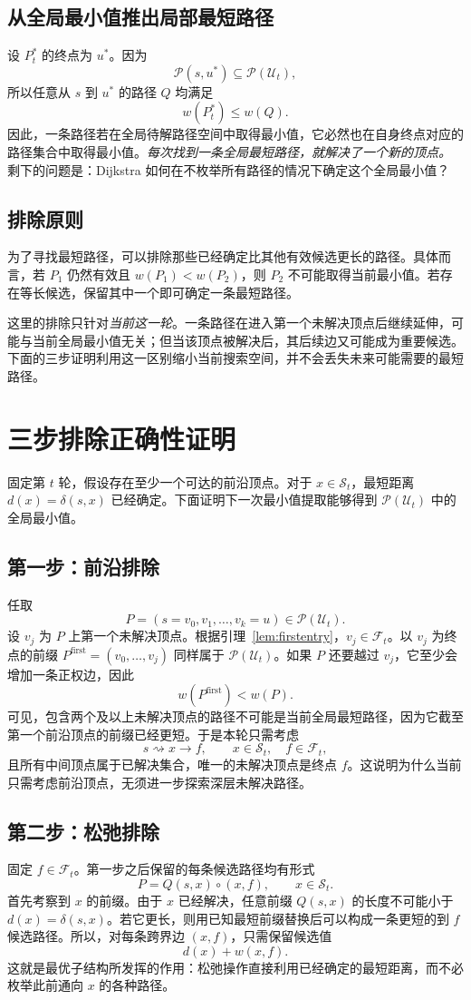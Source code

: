 \documentclass[UTF8,11pt,a4paper]{ctexart}
\newcommand{\Sset}{\mathcal S_t}
\newcommand{\Fset}{\mathcal F_t}
\newcommand{\PathU}{\mathcal P(\mathcal U_t)}
\begin{document}
\subsection{从全局最小值推出局部最短路径}
设 $P_t^*$ 的终点为 $u^*$。因为
\[
  \mathcal P(s,u^*)\subseteq\PathU,
\]
所以任意从 $s$ 到 $u^*$ 的路径 $Q$ 均满足
\[
  w(P_t^*)\le w(Q).
\]
因此，一条路径若在全局待解路径空间中取得最小值，它必然也在自身终点对应的路径集合中取得最小值。\emph{每次找到一条全局最短路径，就解决了一个新的顶点。} 剩下的问题是：Dijkstra 如何在不枚举所有路径的情况下确定这个全局最小值？

\subsection{排除原则}
为了寻找最短路径，可以排除那些已经确定比其他有效候选更长的路径。具体而言，若 $P_1$ 仍然有效且 $w(P_1)<w(P_2)$，则 $P_2$ 不可能取得当前最小值。若存在等长候选，保留其中一个即可确定一条最短路径。

这里的排除只针对\emph{当前这一轮}。一条路径在进入第一个未解决顶点后继续延伸，可能与当前全局最小值无关；但当该顶点被解决后，其后续边又可能成为重要候选。下面的三步证明利用这一区别缩小当前搜索空间，并不会丢失未来可能需要的最短路径。

\section{三步排除正确性证明}\label{sec:proof}
固定第 $t$ 轮，假设存在至少一个可达的前沿顶点。对于 $x\in\Sset$，最短距离 $d(x)=\delta(s,x)$ 已经确定。下面证明下一次最小值提取能够得到 $\PathU$ 中的全局最小值。

\subsection{第一步：前沿排除}
任取
\[
  P=(s=v_0,v_1,\ldots,v_k=u)\in\PathU.
\]
设 $v_j$ 为 $P$ 上第一个未解决顶点。根据引理~\ref{lem:firstentry}，$v_j\in\Fset$。以 $v_j$ 为终点的前缀 $P^{\mathrm{first}}=(v_0,\ldots,v_j)$ 同样属于 $\PathU$。如果 $P$ 还要越过 $v_j$，它至少会增加一条正权边，因此
\[
  w(P^{\mathrm{first}})<w(P).
\]
可见，包含两个及以上未解决顶点的路径不可能是当前全局最短路径，因为它截至第一个前沿顶点的前缀已经更短。于是本轮只需考虑
\[
  s\rightsquigarrow x\to f,
  \qquad x\in\Sset,\quad f\in\Fset,
\]
且所有中间顶点属于已解决集合，唯一的未解决顶点是终点 $f$。这说明为什么当前只需考虑前沿顶点，无须进一步探索深层未解决路径。

\subsection{第二步：松弛排除}
固定 $f\in\Fset$。第一步之后保留的每条候选路径均有形式
\[
  P=Q(s,x)\circ(x,f),\qquad x\in\Sset.
\]
首先考察到 $x$ 的前缀。由于 $x$ 已经解决，任意前缀 $Q(s,x)$ 的长度不可能小于 $d(x)=\delta(s,x)$。若它更长，则用已知最短前缀替换后可以构成一条更短的到 $f$ 候选路径。所以，对每条跨界边 $(x,f)$，只需保留候选值
\[
  d(x)+w(x,f).
\]
这就是最优子结构所发挥的作用：松弛操作直接利用已经确定的最短距离，而不必枚举此前通向 $x$ 的各种路径。
\end{document}
